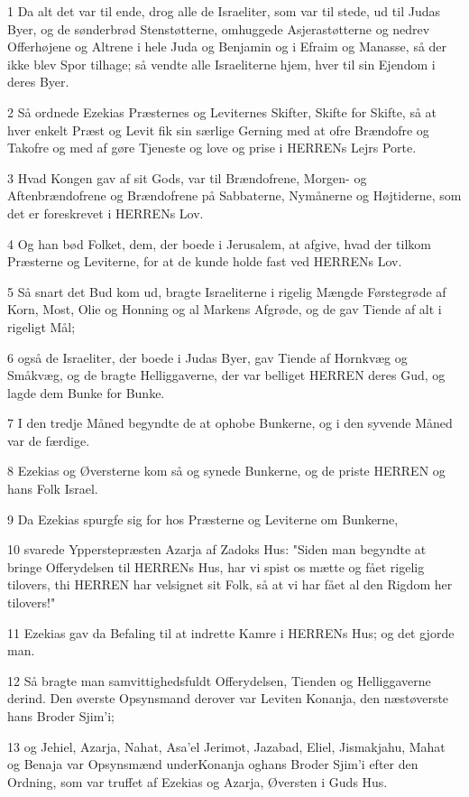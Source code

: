 \par 1 Da alt det var til ende, drog alle de Israeliter, som var til stede, ud til Judas Byer, og de sønderbrød Stenstøtterne, omhuggede Asjerastøtterne og nedrev Offerhøjene og Altrene i hele Juda og Benjamin og i Efraim og Manasse, så der ikke blev Spor tilhage; så vendte alle Israeliterne hjem, hver til sin Ejendom i deres Byer.
\par 2 Så ordnede Ezekias Præsternes og Leviternes Skifter, Skifte for Skifte, så at hver enkelt Præst og Levit fik sin særlige Gerning med at ofre Brændofre og Takofre og med af gøre Tjeneste og love og prise i HERRENs Lejrs Porte.
\par 3 Hvad Kongen gav af sit Gods, var til Brændofrene, Morgen- og Aftenbrændofrene og Brændofrene på Sabbaterne, Nymånerne og Højtiderne, som det er foreskrevet i HERRENs Lov.
\par 4 Og han bød Folket, dem, der boede i Jerusalem, at afgive, hvad der tilkom Præsterne og Leviterne, for at de kunde holde fast ved HERRENs Lov.
\par 5 Så snart det Bud kom ud, bragte Israeliterne i rigelig Mængde Førstegrøde af Korn, Most, Olie og Honning og al Markens Afgrøde, og de gav Tiende af alt i rigeligt Mål;
\par 6 også de Israeliter, der boede i Judas Byer, gav Tiende af Hornkvæg og Småkvæg, og de bragte Helliggaverne, der var belliget HERREN deres Gud, og lagde dem Bunke for Bunke.
\par 7 I den tredje Måned begyndte de at ophobe Bunkerne, og i den syvende Måned var de færdige.
\par 8 Ezekias og Øversterne kom så og synede Bunkerne, og de priste HERREN og hans Folk Israel.
\par 9 Da Ezekias spurgfe sig for hos Præsterne og Leviterne om Bunkerne,
\par 10 svarede Ypperstepræsten Azarja af Zadoks Hus: "Siden man begyndte at bringe Offerydelsen til HERRENs Hus, har vi spist os mætte og fået rigelig tilovers, thi HERREN har velsignet sit Folk, så at vi har fået al den Rigdom her tilovers!"
\par 11 Ezekias gav da Befaling til at indrette Kamre i HERRENs Hus; og det gjorde man.
\par 12 Så bragte man samvittighedsfuldt Offerydelsen, Tienden og Helliggaverne derind. Den øverste Opsynsmand derover var Leviten Konanja, den næstøverste hans Broder Sjim'i;
\par 13 og Jehiel, Azarja, Nahat, Asa'el Jerimot, Jazabad, Eliel, Jismakjahu, Mahat og Benaja var Opsynsmænd underKonanja oghans Broder Sjim'i efter den Ordning, som var truffet af Ezekias og Azarja, Øversten i Guds Hus.
